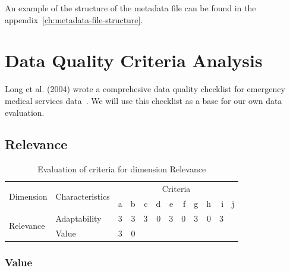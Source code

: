 An example of the structure of the metadata file can be found in the appendix~\ref{ch:metadata-file-structure}.

\section{Data Quality Criteria Analysis}

Long et al. (2004) wrote a comprehesive data quality checklist for emergency medical services data~\cite{long2004}.
We will use this checklist as a base for our own data evaluation.

\subsection{Relevance}

\begin{table}[htbp]
    \centering

    \begin{tabular}{llrrrrrrrrrr}
        \toprule
        \multirow{2}{*}{Dimension}  & \multirow{2}{*}{Characteristics}  & \multicolumn{10}{c}{Criteria}         \\ \cmidrule(lr){3-12}
                                    &                                   & a & b & c & d & e & f & g & h & i & j \\ \midrule
        \multirow{2}{*}{Relevance}  & Adaptability                      & 3 & 3 & 3 & 0 & 3 & 0 & 3 & 0 & 3 &   \\
                                    & Value                             & 3 & 0 &   &   &   &   &   &   &   &   \\
        \bottomrule
    \end{tabular}

    \caption{Evaluation of criteria for dimension Relevance}
    \label{table:relevance-benchmark}
\end{table}
\FloatBarrier

\subsubsection{Value}

